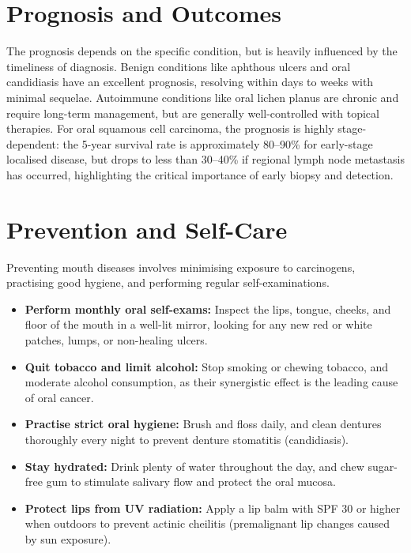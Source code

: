 \section*{Prognosis and Outcomes}
The prognosis depends on the specific condition, but is heavily influenced by the timeliness of diagnosis. Benign conditions like aphthous ulcers and oral candidiasis have an excellent prognosis, resolving within days to weeks with minimal sequelae. Autoimmune conditions like oral lichen planus are chronic and require long-term management, but are generally well-controlled with topical therapies. For oral squamous cell carcinoma, the prognosis is highly stage-dependent: the 5-year survival rate is approximately 80--90\% for early-stage localised disease, but drops to less than 30--40\% if regional lymph node metastasis has occurred, highlighting the critical importance of early biopsy and detection.

\section*{Prevention and Self-Care}
Preventing mouth diseases involves minimising exposure to carcinogens, practising good hygiene, and performing regular self-examinations.
\begin{itemize}
    \item \textbf{Perform monthly oral self-exams:} Inspect the lips, tongue, cheeks, and floor of the mouth in a well-lit mirror, looking for any new red or white patches, lumps, or non-healing ulcers.
    \item \textbf{Quit tobacco and limit alcohol:} Stop smoking or chewing tobacco, and moderate alcohol consumption, as their synergistic effect is the leading cause of oral cancer.
    \item \textbf{Practise strict oral hygiene:} Brush and floss daily, and clean dentures thoroughly every night to prevent denture stomatitis (candidiasis).
    \item \textbf{Stay hydrated:} Drink plenty of water throughout the day, and chew sugar-free gum to stimulate salivary flow and protect the oral mucosa.
    \item \textbf{Protect lips from UV radiation:} Apply a lip balm with SPF 30 or higher when outdoors to prevent actinic cheilitis (premalignant lip changes caused by sun exposure).
\end{itemize}

